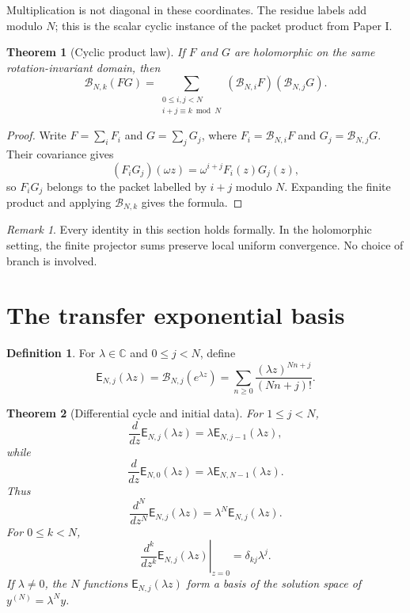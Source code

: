 \documentclass[11pt]{article}
\newtheorem{theorem}{Theorem}[section]
\theoremstyle{definition}
\newtheorem{definition}[definition]{Definition}
\theoremstyle{remark}
\newtheorem{remark}[remark]{Remark}
\newcommand{\CC}{\mathbb C}
\newcommand{\Bcal}{\mathcal B}
\newcommand{\Efun}{\mathsf E}
\begin{document}
Multiplication is not diagonal in these coordinates. The residue labels add
modulo $N$; this is the scalar cyclic instance of the packet product from
Paper I.

\begin{theorem}[Cyclic product law]\label{thm:cyclic_product}
If $F$ and $G$ are holomorphic on the same rotation-invariant domain, then
\[
\Bcal_{N,k}(FG)
=
\sum_{\substack{0\leq i,j<N\\ i+j\equiv k\bmod N}}
(\Bcal_{N,i}F)(\Bcal_{N,j}G).
\]
\end{theorem}

\begin{proof}
Write $F=\sum_iF_i$ and $G=\sum_jG_j$, where
$F_i=\Bcal_{N,i}F$ and $G_j=\Bcal_{N,j}G$.  Their covariance gives
\[
(F_iG_j)(\omega z)=\omega^{i+j}F_i(z)G_j(z),
\]
so $F_iG_j$ belongs to the packet labelled by $i+j$ modulo $N$.
Expanding the finite product and applying $\Bcal_{N,k}$ gives the formula.
\end{proof}

\begin{remark}\label{rem:formal_analytic}
Every identity in this section holds formally.  In the holomorphic setting, the finite projector sums preserve local uniform convergence.  No choice of branch is involved.
\end{remark}

\section{The transfer exponential basis}\label{sec:transfer_exponential}

\begin{definition}\label{def:transfer_exponential}
For $\lambda\in\CC$ and $0\leq j<N$, define
\[
\Efun_{N,j}(\lambda z)
=
\Bcal_{N,j}(e^{\lambda z})
=
\sum_{n\geq0}\frac{(\lambda z)^{Nn+j}}{(Nn+j)!}.
\]
\end{definition}

\begin{theorem}[Differential cycle and initial data]\label{thm:exponential_cycle}
For $1\leq j<N$,
\[
\frac{d}{dz}\Efun_{N,j}(\lambda z)
=
\lambda\Efun_{N,j-1}(\lambda z),
\]
while
\[
\frac{d}{dz}\Efun_{N,0}(\lambda z)
=
\lambda\Efun_{N,N-1}(\lambda z).
\]
Thus
\[
\frac{d^N}{dz^N}\Efun_{N,j}(\lambda z)
=
\lambda^N\Efun_{N,j}(\lambda z).
\]
For $0\leq k<N$,
\[
\left.\frac{d^k}{dz^k}\Efun_{N,j}(\lambda z)\right|_{z=0}
=
\delta_{kj}\lambda^j.
\]
If $\lambda\ne0$, the $N$ functions $\Efun_{N,j}(\lambda z)$ form a basis of the solution space of $y^{(N)}=\lambda^Ny$.
\end{theorem}
\end{document}
